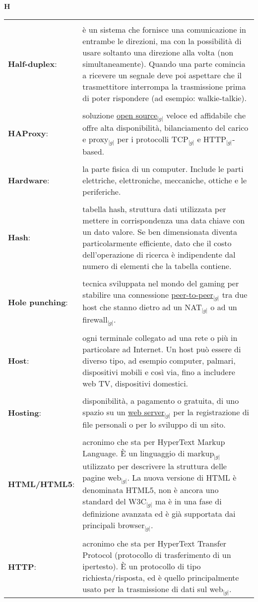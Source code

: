 \hfill\Huge{\textbf{H}}\\
\normalsize
\label{tabVers}
	\begin{longtable}{p{} p{}} 
	    \toprule
	    \\
	    \textbf{Half-duplex}:		&	è un sistema che fornisce una comunicazione in entrambe le direzioni, ma con la possibilità di usare soltanto una direzione alla volta (non simultaneamente). Quando una parte comincia 
							a ricevere un segnale deve poi aspettare che il trasmettitore interrompa la trasmissione prima di poter rispondere (ad esempio: walkie-talkie).\\
	    \\
	    \textbf{HAProxy}:			&	soluzione \underline{open source}$_{|g|}$ veloce ed affidabile che offre alta disponibilità, bilanciamento del carico e proxy$_{|g|}$ per i protocolli TCP$_{|g|}$ e HTTP$_{|g|}$-based.\\
	    \\
	    \textbf{Hardware}:			&	la parte fisica di un computer. Include le parti elettriche, elettroniche, meccaniche, ottiche e le periferiche.\\
	    \\
	    \textbf{Hash}:			&	tabella hash, struttura dati utilizzata per mettere in corrispondenza una data chiave con un dato valore. Se ben dimensionata diventa particolarmente efficiente, dato che il costo 
							dell’operazione di ricerca è indipendente dal numero di elementi che la tabella contiene.\\
	    \\
	    \textbf{Hole punching}: 		&	tecnica sviluppata nel mondo del gaming per stabilire una connessione \underline{peer-to-peer}$_{|g|}$ tra due host che stanno dietro ad un NAT$_{|g|}$ o ad un firewall$_{|g|}$.\\
	    \\
	    \textbf{Host}:			&	ogni terminale collegato ad una rete o più in particolare ad Internet. Un host può essere di diverso tipo, ad esempio computer, palmari, dispositivi mobili e così via, fino a includere web TV, dispositivi domestici.\\
	    \\
	    \textbf{Hosting}:			&	disponibilità, a pagamento o gratuita, di uno spazio su un \underline{web server}$_{|g|}$ per la registrazione di file personali o per lo sviluppo di un sito.\\
	    \\
	    \textbf{HTML/HTML5}:		&	acronimo che sta per HyperText Markup Language. \`E un linguaggio di markup$_{|g|}$ utilizzato per descrivere la struttura delle pagine web$_{|g|}$.\newline
							La nuova versione di HTML è denominata HTML5, non è ancora uno standard del W3C$_{|g|}$ ma è in una fase di definizione avanzata ed è già supportata dai principali browser$_{|g|}$.\\
	    \\
	    \textbf{HTTP}:	 		&	acronimo che sta per HyperText Transfer Protocol (protocollo di trasferimento di un ipertesto). \`E un protocollo di tipo richiesta/risposta, ed è quello principalmente usato 
							per la trasmissione di dati sul web$_{|g|}$.\\
	\end{longtable}
